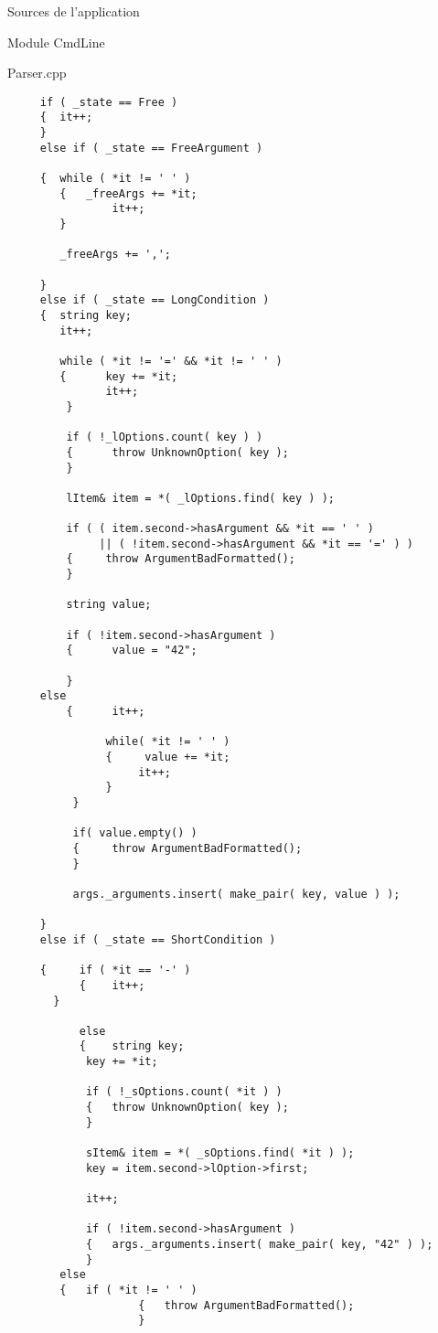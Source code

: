 \documentclass{article}
\begin{document}
\begin{section}{Sources de l'application}
\begin{subsection}{Module CmdLine}
\begin{paragraph}{Parser.cpp}
\begin{verbatim}
     if ( _state == Free ) 
     {	it++;
     }
     else if ( _state == FreeArgument )

     {	while ( *it != ' ' ) 
        {	_freeArgs += *it;
               	it++;
        }

        _freeArgs += ',';

     } 
     else if ( _state == LongCondition ) 
     {	string key;
        it++;

        while ( *it != '=' && *it != ' ' ) 
        {      key += *it;
               it++;
         }

         if ( !_lOptions.count( key ) ) 
         {      throw UnknownOption( key );
         }

         lItem& item = *( _lOptions.find( key ) );

         if ( ( item.second->hasArgument && *it == ' ' )
              || ( !item.second->hasArgument && *it == '=' ) ) 
         {     throw ArgumentBadFormatted();
         }

         string value;

         if ( !item.second->hasArgument ) 
         {      value = "42";

         }
	 else 
         {      it++;

               while( *it != ' ' )
               {     value += *it;
                    it++;
               }
          }

          if( value.empty() ) 
          {     throw ArgumentBadFormatted();
          }

          args._arguments.insert( make_pair( key, value ) );

     }
     else if ( _state == ShortCondition ) 

     {     if ( *it == '-' ) 
           {    it++;
	   }
     
     	   else 
     	   {	string key;
           	key += *it;

           	if ( !_sOptions.count( *it ) ) 
           	{	throw UnknownOption( key );
           	}

           	sItem& item = *( _sOptions.find( *it ) );
           	key = item.second->lOption->first;
	
           	it++;
	
           	if ( !item.second->hasArgument ) 
           	{	args._arguments.insert( make_pair( key, "42" ) );
           	}
	   	else
	   	{	if ( *it != ' ' ) 
                	{	throw ArgumentBadFormatted();
                	}
	

\end{verbatim}
\end{paragraph}
\end{subsection}
\end{section}
\end{document}

